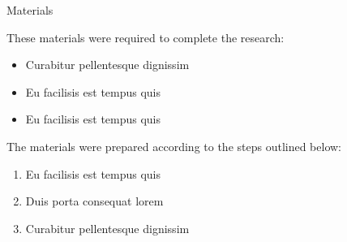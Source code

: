\documentclass[final]{beamer}
\newlength{\onecolwid}
\newlength{\twocolwid}
\begin{document}
\begin{frame}[t]
\begin{columns}[t]
    \begin{column}{\twocolwid} %

      \begin{columns}[t,totalwidth=\twocolwid] %

        \begin{column}{\onecolwid}\vspace{-.6in} %


          \begin{block}{Materials}

            These materials were required to complete the research:

            \begin{itemize}
              \item Curabitur pellentesque dignissim
              \item Eu facilisis est tempus quis
              \item Eu facilisis est tempus quis
            \end{itemize}

            The materials were prepared according to the steps outlined below:

            \begin{enumerate}
              \item Eu facilisis est tempus quis
              \item Duis porta consequat lorem
              \item Curabitur pellentesque dignissim
            \end{enumerate}

          \end{block}


        \end{column} %

        \begin{column}{\onecolwid}\vspace{-.6in} %


\end{column}
\end{columns}
\end{column}
\end{columns}
\end{frame}
\end{document}
